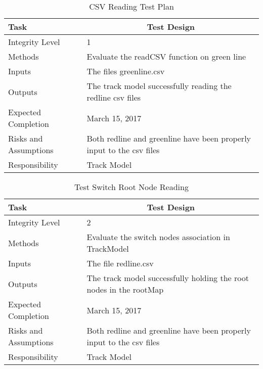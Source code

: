 \documentclass[]{article}
\begin{document}
\begin{table}[H]
	\centering
	\caption{CSV Reading Test Plan}
	\begin{tabular}{|l|l|}
		\hline
		Task & \multicolumn{1}{c|}{Test Design} \\ \hline
		Integrity Level & 1 \\ \hline
		Methods & Evaluate the readCSV function on green line\\ \hline
		Inputs &  The files greenline.csv \\ \hline
		Outputs &  The track model successfully reading the redline csv files\\ \hline
		Expected Completion & March 15, 2017\\ \hline
		Risks and Assumptions & \parbox[t]{10cm}{Both redline and greenline have been properly input to the csv files}\\ \hline
		Responsibility & Track Model\\ \hline
	\end{tabular}
\end{table}

\begin{table}[H]
	\centering
	\caption{Test Switch Root Node Reading}
	\begin{tabular}{|l|l|}
		\hline
		Task & \multicolumn{1}{c|}{Test Design} \\ \hline
		Integrity Level & 2 \\ \hline
		Methods & \parbox[t]{10cm}{Evaluate the switch nodes association in TrackModel}\\ \hline
		Inputs &  The file redline.csv \\ \hline
		Outputs &  The track model successfully holding the root nodes in the rootMap\\ \hline
		Expected Completion & March 15, 2017\\ \hline
		Risks and Assumptions & Both redline and greenline have been properly input to the csv files \\ \hline
		Responsibility & Track Model\\ \hline
	\end{tabular}
\end{table}
\end{document}
